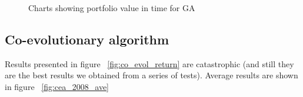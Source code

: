 \begin{figure}[htb]
  \caption{Charts showing portfolio value in time for GA}
\label{fig:GA_2}
\end{figure}

\subsection{Co-evolutionary algorithm}

Results presented in figure ~\ref{fig:co_evol_return} are catastrophic (and still they are the best results we obtained from a series of tests).
Average results are shown in figure ~\ref{fig:cea_2008_ave}

